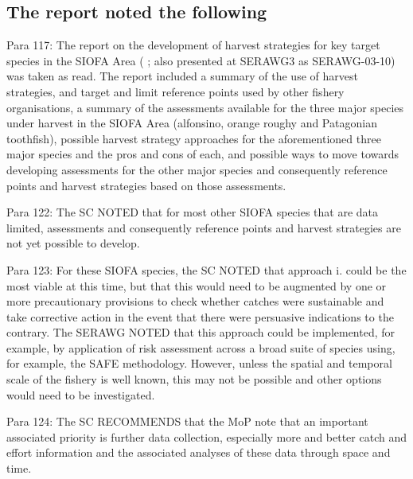\subsection{The \cite{SC6} report noted the following}

Para 117: The report on the development of harvest strategies for key target species in the SIOFA Area (\cite{butterworth_report_2021} ; also presented at SERAWG3 as SERAWG-03-10) was taken as read. The report included a summary of the use of harvest strategies, and target and limit reference points used by other fishery organisations, a summary of the assessments available for the three major species under harvest in the SIOFA Area (alfonsino, orange roughy and Patagonian toothfish), possible harvest strategy approaches for the aforementioned three major species and the pros and cons of each, and possible ways to move towards developing assessments for the other major species and consequently reference points and harvest strategies based on those assessments.

Para 122: The SC NOTED that for most other SIOFA species that are data limited, assessments and consequently reference points and harvest strategies are not yet possible to develop.

Para 123: For these SIOFA species, the SC NOTED that approach i. could be the most viable at this time, but that this would need to be augmented by one or more precautionary provisions to check whether catches were sustainable and take corrective action in the event that there were persuasive indications to the contrary. The SERAWG NOTED that this approach could be implemented, for example, by application of risk assessment across a broad suite of species using, for example, the SAFE methodology. However, unless the spatial and temporal scale of the fishery is well known, this may not be possible and other options would need to be investigated.

Para 124: The SC RECOMMENDS that the MoP note that an important associated priority is further data collection, especially more and better catch and effort information and the associated analyses of these data through space and time.

